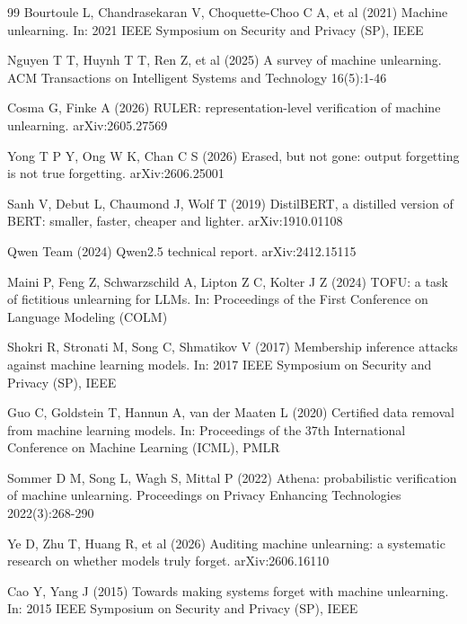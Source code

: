 \begin{thebibliography}{99}
Bourtoule L, Chandrasekaran V, Choquette-Choo C A, et al (2021) Machine unlearning. In: 2021 IEEE Symposium on Security and Privacy (SP), IEEE

Nguyen T T, Huynh T T, Ren Z, et al (2025) A survey of machine unlearning. ACM Transactions on Intelligent Systems and Technology 16(5):1-46

Cosma G, Finke A (2026) RULER: representation-level verification of machine unlearning. arXiv:2605.27569

Yong T P Y, Ong W K, Chan C S (2026) Erased, but not gone: output forgetting is not true forgetting. arXiv:2606.25001

Sanh V, Debut L, Chaumond J, Wolf T (2019) DistilBERT, a distilled version of BERT: smaller, faster, cheaper and lighter. arXiv:1910.01108

Qwen Team (2024) Qwen2.5 technical report. arXiv:2412.15115

Maini P, Feng Z, Schwarzschild A, Lipton Z C, Kolter J Z (2024) TOFU: a task of fictitious unlearning for LLMs. In: Proceedings of the First Conference on Language Modeling (COLM)

Shokri R, Stronati M, Song C, Shmatikov V (2017) Membership inference attacks against machine learning models. In: 2017 IEEE Symposium on Security and Privacy (SP), IEEE

Guo C, Goldstein T, Hannun A, van der Maaten L (2020) Certified data removal from machine learning models. In: Proceedings of the 37th International Conference on Machine Learning (ICML), PMLR

Sommer D M, Song L, Wagh S, Mittal P (2022) Athena: probabilistic verification of machine unlearning. Proceedings on Privacy Enhancing Technologies 2022(3):268-290

Ye D, Zhu T, Huang R, et al (2026) Auditing machine unlearning: a systematic research on whether models truly forget. arXiv:2606.16110

Cao Y, Yang J (2015) Towards making systems forget with machine unlearning. In: 2015 IEEE Symposium on Security and Privacy (SP), IEEE


\end{thebibliography}
